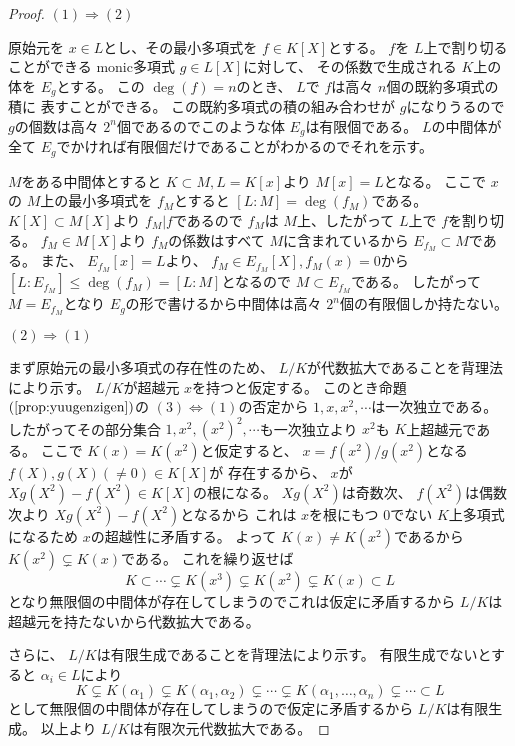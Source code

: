 \documentclass[../master_galois_theory]{subfiles}
\begin{document}
\begin{proof}
  $(1) \Rightarrow (2)$

  原始元を $x \in L$とし、その最小多項式を $f \in K[X]$とする。
  $f$を $L$上で割り切ることができる \rm{monic}多項式 $g \in L[X]$に対して、
  その係数で生成される $K$上の体を $E_g$とする。
  この $\deg(f) = n$のとき、 $L$で $f$は高々 $n$個の既約多項式の積に
  表すことができる。
  この既約多項式の積の組み合わせが $g$になりうるので
  $g$の個数は高々 $2^n$個であるのでこのような体 $E_g$は有限個である。
  $L$の中間体が全て $E_g$でかければ有限個だけであることがわかるのでそれを示す。

  $M$をある中間体とすると $K \subset M , L = K[x]$より $M[x] = L$となる。
  ここで $x$の $M$上の最小多項式を $f_M$とすると $[L:M] = \deg(f_M)$である。
  $K[X] \subset M[X]$より $f_M | f$であるので $f_M$は
  $M$上、したがって $L$上で $f$を割り切る。
  $f_M \in M[X]$より $f_M$の係数はすべて $M$に含まれているから
  $E_{f_M} \subset M$である。
  また、 $E_{f_M}[x] = L$より、 $f_M \in E_{f_M}[X] , f_M(x) = 0$から
  $[L:E_{f_M}] \leq \deg(f_M) = [L:M]$となるので $M \subset E_{f_M}$である。
  したがって $M = E_{f_M}$となり $E_g$の形で書けるから中間体は高々 $2^n$個の有限個しか持たない。

  $(2) \Rightarrow (1)$

  まず原始元の最小多項式の存在性のため、
  $L/K$が代数拡大であることを背理法により示す。
  $L/K$が超越元 $x$を持つと仮定する。
  このとき命題 $(\mathrm{\ref{prop:yuugenzigen}})$の $(3) \Leftrightarrow (1)$の否定から
  $1 , x , x^2 , \cdots$は一次独立である。
  したがってその部分集合 $1 , x^2 , (x^2)^2 , \cdots$も一次独立より
  $x^2$も $K$上超越元である。
  ここで $K(x) = K(x^2)$と仮定すると、
  $x = f(x^2)/g(x^2)$となる $f(X) , g(X) (\neq 0) \in K[X]$が
  存在するから、 $x$が $X g(X^2) - f(X^2) \in K[X]$の根になる。
  $X g(X^2)$は奇数次、 $f(X^2)$は偶数次より $X g(X^2) - f(X^2)$となるから
  これは $x$を根にもつ $0$でない $K$上多項式になるため $x$の超越性に矛盾する。
  よって $K(x) \neq K(x^2)$であるから $K(x^2) \subsetneq K(x)$である。
  これを繰り返せば
  \[
  K \subset \cdots \subsetneq K(x^3) \subsetneq K(x^2) \subsetneq K(x) \subset L
  \]
  となり無限個の中間体が存在してしまうのでこれは仮定に矛盾するから
  $L/K$は超越元を持たないから代数拡大である。

  さらに、 $L/K$は有限生成であることを背理法により示す。
  有限生成でないとすると $\alpha_i \in L$により
  \[
  K \subsetneq K(\alpha_1) \subsetneq K(\alpha_1 , \alpha_2) \subsetneq \cdots \subsetneq K(\alpha_1 , \dots , \alpha_n) \subsetneq \cdots \subset L
  \]
  として無限個の中間体が存在してしまうので仮定に矛盾するから
  $L/K$は有限生成。
  以上より $L/K$は有限次元代数拡大である。


\end{proof}
\end{document}
